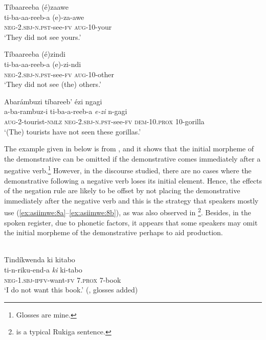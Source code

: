 \documentclass[output=paper 		  ]{langscibook}
\begin{document}
    \ex\label{ex:asiimwe:6c} Tíbaareeba (é)zaawe\\
  \gll ti-ba-aa-reeb-a  (e)-za-awe\\
  \textsc{neg-2.sbj-n.pst}{}-see-\textsc{fv}  \textsc{aug}{}-10-your\\
  \glt ‘They did not see yours.’

    \ex\label{ex:asiimwe:6d}  Tíbaareeba (é)zindi\\
 \gll ti-ba-aa-reeb-a  (e)-zi-ndi\\
  \textsc{neg}{}-\textsc{2.sbj-n.pst}{}-see-\textsc{fv}  \textsc{aug}{}-10-other\\
  \glt ‘They did not see (the) others.’

  \ex\label{ex:asiimwe:6e}  Abarámbuzi tíbareeb’ ézi ngagi\\
    \gll a-ba-rambuz-i  ti-ba-a-reeb-a  \emph{e-zi}  n-gagi\\
    \textsc{aug-}2-tourist-\textsc{nmlz}  \textsc{neg}{}-2.\textsc{sbj-n.pst}{}-see-\textsc{fv}  \textsc{dem}{}-10.\textsc{prox}  10-gorilla\\
  \glt ‘(The) tourists have not seen these gorillas.’
    \z
\z

The example given in  below is from \citet[151]{MorrisKirwan1972}, and it shows that the initial morpheme of the demonstrative can be omitted if the demonstrative comes immediately after a negative verb.\footnote{Glosses are mine.} However, in the discourse studied, there are no cases where  the demonstrative following a negative verb loses its initial element. Hence, the effects of the negation rule are likely to be offset by not placing the demonstrative immediately after the negative verb and this is the strategy that speakers mostly use (\ref{ex:asiimwe:8a}--\ref{ex:asiimwe:8b}), as was also observed in \citet[137]{Taylor1985}\footnote{ is a typical Rukiga sentence.}. Besides, in the spoken register, due to phonetic factors, it appears that some speakers may omit the initial morpheme of the demonstrative perhaps to aid production.

\ea%
    \label{ex:asiimwe:7} \citet[124]{Asiimwe2014}\\
    Tindíkwenda ki kitabo\\
    \gll ti-n-riku-end-a  \emph{ki}  ki-tabo\\
\textsc{neg}{}-1.\textsc{sbj}{}-\textsc{ipfv}{}-want-\textsc{fv}  7.\textsc{prox}  7-book\\
    \glt ‘I do not want this book.’  (\citealt[151]{MorrisKirwan1972}, glosses added)
\end{document}
